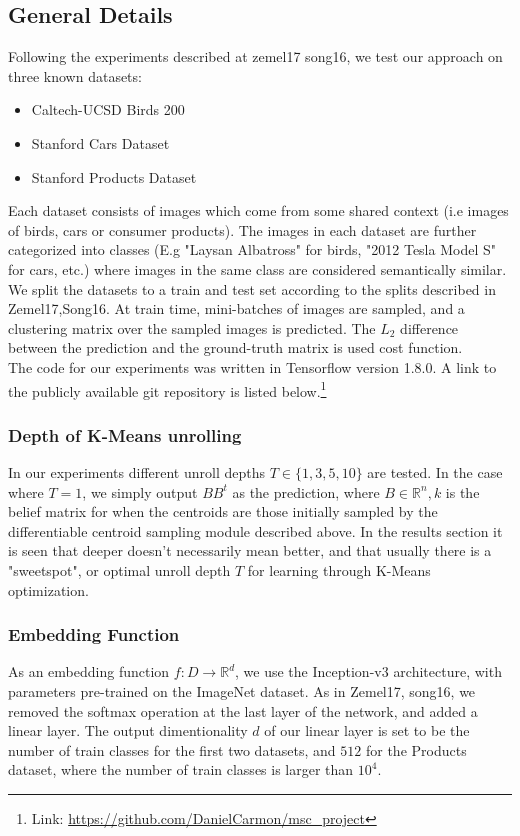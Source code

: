 \subsection{General Details}
Following the experiments described at zemel17 song16, we test our approach on three known datasets:\\
\begin{itemize}
\item Caltech-UCSD Birds 200 \cite{WahCUB_200_2011}
\item Stanford Cars Dataset
\item Stanford Products Dataset
\end{itemize}
Each dataset consists of images which come from some shared context (i.e images of birds, cars or consumer products). The images in each dataset are further categorized into classes (E.g "Laysan Albatross" for birds, "2012 Tesla Model S" for cars, etc.) where images in the same class are considered semantically similar.
We split the datasets to a train and test set according to the splits described in Zemel17,Song16. At train time, mini-batches of images are sampled, and a clustering matrix over the sampled images is predicted. The $L_2$ difference between the prediction and the ground-truth matrix is used cost function.\\
The code for our experiments was written in Tensorflow \cite{greenwade93} version 1.8.0. A link to the publicly available git repository is listed below.\footnote{Link: \url{https://github.com/DanielCarmon/msc_project}}
\subsubsection{Depth of K-Means unrolling}
In our experiments different unroll depths $T\in\{1,3,5,10\}$ are tested. In the case where $T=1$, we simply output $BB^t$ as the prediction, where $B\in\mathbb{R}^n,k$ is the belief matrix for when the centroids are those initially sampled by the differentiable centroid sampling module described above. 
In the results section it is seen that deeper doesn't necessarily mean better, and that usually there is a "sweetspot", or optimal unroll depth $T$ for learning through K-Means optimization.

\subsubsection{Embedding Function}
As an embedding function $f:D\rightarrow \mathbb{R}^d$, we use the Inception-v3 \cite{greenwade93} architecture, with parameters pre-trained on the ImageNet\cite{greenwade93} dataset. As in Zemel17, song16, we removed the softmax operation at the last layer of the network, and added a linear layer. The output dimentionality $d$ of our linear layer is set to be the number of train classes for the first two datasets, and $512$ for the Products dataset, where the number of train classes is larger than $10^4$.\\


